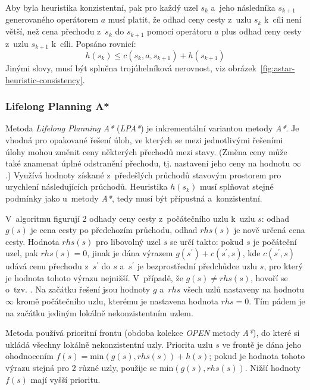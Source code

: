 Aby byla heuristika konzistentní, pak pro každý uzel $s_k$ a~jeho následníka $s_{k+1}$ generovaného operátorem $a$ musí platit, že odhad ceny cesty z~uzlu $s_k$ k~cíli není větší, než cena přechodu z~$s_k$ do $s_{k+1}$ pomocí operátoru $a$ plus odhad ceny cesty z~uzlu $s_{k+1}$ k~cíli. Popsáno rovnicí:
\begin{equation}
    h(s_k) \le c(s_k, a, s_{k+1}) + h(s_{k+1})
\end{equation}
Jinými slovy, musí být splněna trojúhelníková nerovnost, viz obrázek~\ref{fig:astar-heuristic-consistency}.

\subsubsection*{Lifelong Planning A*}

Metoda \emph{Lifelong Planning A*} (\emph{LPA*}) \cite{D_star_lite} je inkrementální variantou metody \emph{A*}. Je vhodná pro opakované řešení úloh, ve kterých se mezi jednotlivými řešeními úlohy mohou změnit ceny některých přechodů mezi stavy. (Změna ceny může také znamenat úplné odstranění přechodu, tj. nastavení jeho ceny na hodnotu $\infty$.) Využívá hodnoty získané z~předešlých průchodů stavovým prostorem pro urychlení následujících průchodů. Heuristika $h(s_k)$ musí splňovat stejné podmínky jako u~metody \emph{A*}, tedy musí být přípustná a~konzistentní.

V~algoritmu figurují 2 odhady ceny cesty z~počátečního uzlu k~uzlu $s$: odhad $g(s)$ je cena cesty po předchozím průchodu, odhad $rhs(s)$ je nově určená cena cesty. Hodnota $rhs(s)$ pro libovolný uzel $s$ se určí takto: pokud $s$ je počáteční uzel, pak $rhs(s) = 0$, jinak je dána výrazem $g(s^\prime) + c(s^\prime, s)$, kde $c(s^\prime, s)$ udává cenu přechodu z~$s^\prime$ do $s$ a~$s^\prime$ je bezprostřední předchůdce uzlu $s$, pro který je hodnota tohoto výrazu nejnižší. V~případě, že $g(s) \neq rhs(s)$, hovoří se o~tzv. . Na začátku řešení jsou hodnoty $g$ a~$rhs$ všech uzlů nastaveny na hodnotu $\infty$ kromě počátečního uzlu, kterému je nastavena hodnota $rhs = 0$. Tím pádem je na začátku jediným lokálně nekonzistentním uzlem.

Metoda používá prioritní frontu (obdoba kolekce \emph{OPEN} metody \emph{A*}), do které si ukládá všechny lokálně nekonzistentní uzly. Priorita uzlu $s$ ve frontě je dána jeho ohodnocením $f(s) = \mathrm{min}(g(s), rhs(s)) + h(s)$; pokud je hodnota tohoto výrazu stejná pro 2 různé uzly, použije se $\mathrm{min}(g(s), rhs(s))$. Nižší hodnoty $f(s)$ mají vyšší prioritu.

